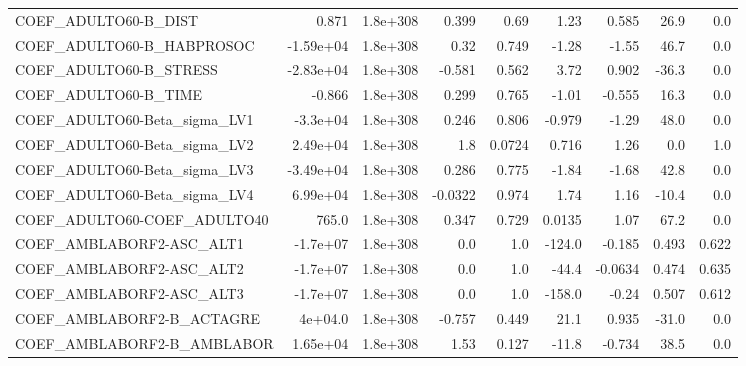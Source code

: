 \begin{tabular}{lrrrrrrrr}
COEF\_ADULTO60-B\_DIST              &       0.871 &     1.8e+308 &    0.399 &     0.69 &       1.23 &       0.585 &         26.9 &           0.0 \\
COEF\_ADULTO60-B\_HABPROSOC         &   -1.59e+04 &     1.8e+308 &     0.32 &    0.749 &      -1.28 &       -1.55 &         46.7 &           0.0 \\
COEF\_ADULTO60-B\_STRESS            &   -2.83e+04 &     1.8e+308 &   -0.581 &    0.562 &       3.72 &       0.902 &        -36.3 &           0.0 \\
COEF\_ADULTO60-B\_TIME              &      -0.866 &     1.8e+308 &    0.299 &    0.765 &      -1.01 &      -0.555 &         16.3 &           0.0 \\
COEF\_ADULTO60-Beta\_sigma\_LV1      &    -3.3e+04 &     1.8e+308 &    0.246 &    0.806 &     -0.979 &       -1.29 &         48.0 &           0.0 \\
COEF\_ADULTO60-Beta\_sigma\_LV2      &    2.49e+04 &     1.8e+308 &      1.8 &   0.0724 &      0.716 &        1.26 &          0.0 &           1.0 \\
COEF\_ADULTO60-Beta\_sigma\_LV3      &   -3.49e+04 &     1.8e+308 &    0.286 &    0.775 &      -1.84 &       -1.68 &         42.8 &           0.0 \\
COEF\_ADULTO60-Beta\_sigma\_LV4      &    6.99e+04 &     1.8e+308 &  -0.0322 &    0.974 &       1.74 &        1.16 &        -10.4 &           0.0 \\
COEF\_ADULTO60-COEF\_ADULTO40       &       765.0 &     1.8e+308 &    0.347 &    0.729 &     0.0135 &        1.07 &         67.2 &           0.0 \\
COEF\_AMBLABORF2-ASC\_ALT1          &    -1.7e+07 &     1.8e+308 &      0.0 &      1.0 &     -124.0 &      -0.185 &        0.493 &         0.622 \\
COEF\_AMBLABORF2-ASC\_ALT2          &    -1.7e+07 &     1.8e+308 &      0.0 &      1.0 &      -44.4 &     -0.0634 &        0.474 &         0.635 \\
COEF\_AMBLABORF2-ASC\_ALT3          &    -1.7e+07 &     1.8e+308 &      0.0 &      1.0 &     -158.0 &       -0.24 &        0.507 &         0.612 \\
COEF\_AMBLABORF2-B\_ACTAGRE         &     4e+04.0 &     1.8e+308 &   -0.757 &    0.449 &       21.1 &       0.935 &        -31.0 &           0.0 \\
COEF\_AMBLABORF2-B\_AMBLABOR        &    1.65e+04 &     1.8e+308 &     1.53 &    0.127 &      -11.8 &      -0.734 &         38.5 &           0.0 \\

\end{tabular}
